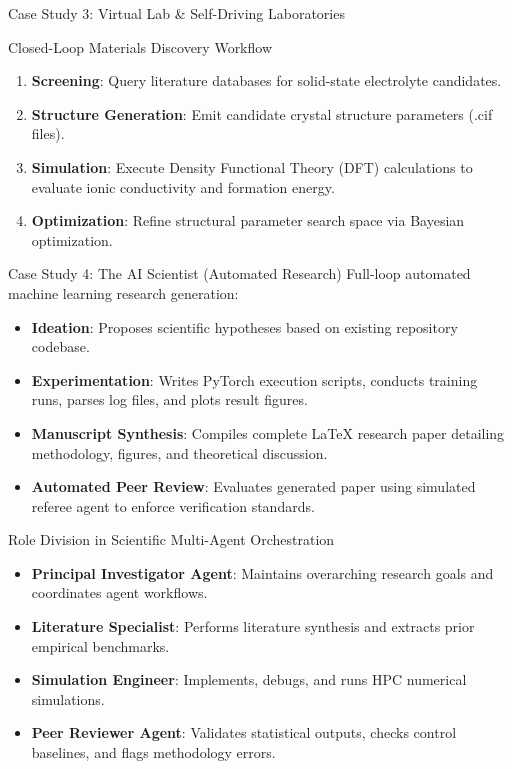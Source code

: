 \documentclass[10pt, aspectratio=169]{beamer}
\begin{document}
\begin{frame}{Case Study 3: Virtual Lab \& Self-Driving Laboratories}
  \begin{block}{Closed-Loop Materials Discovery Workflow}
    \begin{enumerate}
      \item \textbf{Screening}: Query literature databases for solid-state electrolyte candidates.
      \item \textbf{Structure Generation}: Emit candidate crystal structure parameters (.cif files).
      \item \textbf{Simulation}: Execute Density Functional Theory (DFT) calculations to evaluate ionic conductivity and formation energy.
      \item \textbf{Optimization}: Refine structural parameter search space via Bayesian optimization.
    \end{enumerate}
  \end{block}
\end{frame}

\begin{frame}{Case Study 4: The AI Scientist (Automated Research)}
  Full-loop automated machine learning research generation:
  \begin{itemize}
    \item \textbf{Ideation}: Proposes scientific hypotheses based on existing repository codebase.
    \item \textbf{Experimentation}: Writes PyTorch execution scripts, conducts training runs, parses log files, and plots result figures.
    \item \textbf{Manuscript Synthesis}: Compiles complete LaTeX research paper detailing methodology, figures, and theoretical discussion.
    \item \textbf{Automated Peer Review}: Evaluates generated paper using simulated referee agent to enforce verification standards.
  \end{itemize}
\end{frame}

\begin{frame}{Role Division in Scientific Multi-Agent Orchestration}
  \begin{itemize}
    \item \textbf{Principal Investigator Agent}: Maintains overarching research goals and coordinates agent workflows.
    \item \textbf{Literature Specialist}: Performs literature synthesis and extracts prior empirical benchmarks.
    \item \textbf{Simulation Engineer}: Implements, debugs, and runs HPC numerical simulations.
    \item \textbf{Peer Reviewer Agent}: Validates statistical outputs, checks control baselines, and flags methodology errors.
  \end{itemize}
\end{frame}
\end{document}
